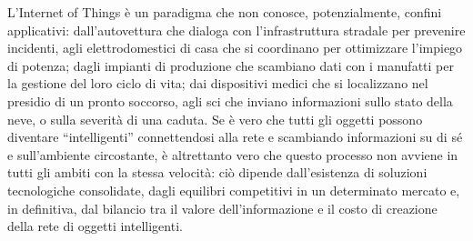 \noindent L’Internet of Things è un paradigma che non conosce, potenzialmente, confini applicativi: dall’autovettura che dialoga con l’infrastruttura stradale per prevenire incidenti, agli elettrodomestici di casa che si coordinano per ottimizzare l’impiego di potenza; dagli impianti di produzione che scambiano dati con i manufatti per la gestione del loro ciclo di vita; dai dispositivi medici che si localizzano nel presidio di un pronto soccorso, agli sci che inviano informazioni sullo stato della neve, o sulla severità di una caduta. Se è vero che tutti gli oggetti possono diventare “intelligenti” connettendosi alla rete e scambiando informazioni su di sé e sull’ambiente circostante, è altrettanto vero che questo processo non avviene in tutti gli ambiti con la stessa velocità: ciò dipende dall’esistenza di soluzioni tecnologiche consolidate, dagli equilibri competitivi in un determinato mercato e, in definitiva, dal bilancio tra il valore dell’informazione e il costo di creazione della rete di oggetti intelligenti.\\

